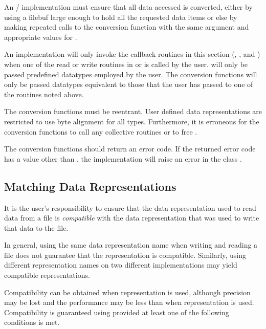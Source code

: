 An \MPI/ implementation must ensure that all data accessed is converted,
either by using a filebuf large enough to hold all the requested
data items
or else by making repeated calls to the conversion function
with the same  argument and appropriate values for
.

An implementation will only invoke the callback routines in this section
\flushline
(, ,
and )
when one of the read or write routines in 
or  is called by the user.  
 will only be passed
predefined datatypes employed by the user.
The conversion functions will only be passed datatypes equivalent to those
that the user has passed to one of the routines noted above.

The conversion functions must be reentrant.
User defined data representations are restricted
to use byte alignment for all types.
Furthermore, it is erroneous for the conversion functions to
call any collective routines or to free .

The conversion functions should return an error code.
If the returned error
code has a value other than , the
implementation will raise an error in the class .


\subsection{Matching Data Representations}
It is the user's responsibility to ensure that the
data representation used to read data from a file is \emph{compatible} with
the data representation that was used to write that data to the file.

In general, using the same data representation name when writing
and reading a file does not guarantee that the representation is 
compatible.  Similarly, using different representation names on
two different implementations may yield compatible representations.

Compatibility can be obtained when  representation is
used, although precision may be lost and the performance
may be less than when  representation is used.  
Compatibility is guaranteed using 
provided at least one of the
following conditions is met.


